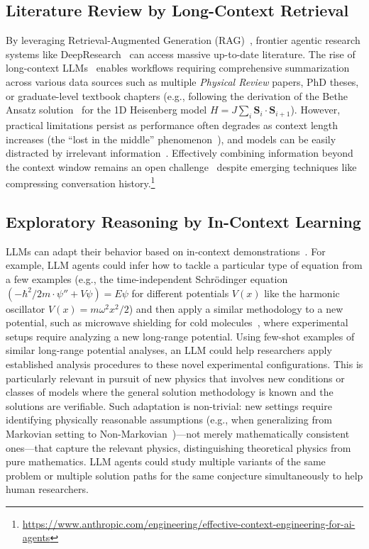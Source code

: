 \subsection{Literature Review by Long-Context  Retrieval}
\label{sec:skill_literature}
By leveraging Retrieval-Augmented Generation (RAG)~\cite{Lewis2020Retrievalaugmented}, frontier agentic research systems like DeepResearch~\cite{OpenAI2025Introducing} can access massive up-to-date literature. The rise of long-context LLMs~\cite{Team2024Gemini} enables workflows requiring comprehensive summarization across various data sources such as multiple \textit{Physical Review} papers, PhD theses, or graduate-level textbook chapters (e.g., following the derivation of the Bethe Ansatz solution~\cite{Bethe1931Zur,Essler2005Onedimensional} for the 1D Heisenberg model $H = J \sum_i \mathbf{S}_i \cdot \mathbf{S}_{i+1}$). However, practical limitations persist as performance often degrades as context length increases (the ``lost in the middle'' phenomenon~\cite{Liu2023Lost}), and models can be easily distracted by irrelevant information~\cite{Shi2023Large}. Effectively combining information beyond the context window remains an open challenge~\cite{Beltagy2020Longformer,Skarlinski2024Language} despite emerging techniques like compressing conversation history.\footnote{\url{https://www.anthropic.com/engineering/effective-context-engineering-for-ai-agents}}

\subsection{Exploratory Reasoning by In-Context Learning}
\label{sec:skill_few_shot}
LLMs can adapt their behavior based on in-context demonstrations~\cite{Brown2020Language,Madaan2022Language}. For example, LLM agents could infer how to tackle a particular type of equation from a few examples (e.g., the time-independent Schr{\"o}dinger equation $(-\hbar^2/2m \cdot \psi'' + V\psi) = E\psi$ for different potentials $V(x)$ like the harmonic oscillator $V(x) =m\omega^2x^2/2$) and then apply a similar methodology to a new potential, such as microwave shielding for cold molecules~\cite{Chen2023Fieldlinked,Deng2023Effective}, where experimental setups require analyzing a new long-range potential. Using few-shot examples of similar long-range potential analyses, an LLM could help researchers apply established analysis procedures to these novel experimental configurations.
This is particularly relevant in pursuit of new physics that involves new conditions or classes of models where the general solution methodology is known and the solutions are verifiable. Such adaptation is non-trivial: new settings require identifying physically reasonable assumptions (e.g., when generalizing from Markovian setting to Non-Markovian~\cite{Cubitt2015Stability})---not merely mathematically consistent ones---that capture the relevant physics, distinguishing theoretical physics from pure mathematics. LLM agents could study multiple variants of the same problem or multiple solution paths for the same conjecture simultaneously to help human researchers.
